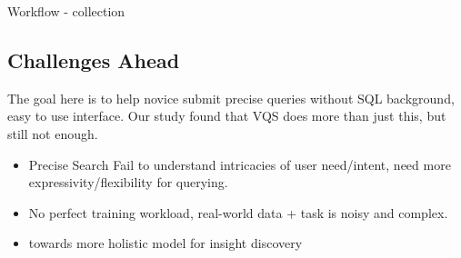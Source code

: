 Workflow 
	- collection 
\subsection{Challenges Ahead}
The goal here is to help novice submit precise queries without SQL background, easy to use interface. Our study found that VQS does more than just this, but still not enough.
\begin{itemize}
	\item Precise Search Fail to understand intricacies of user need/intent, need more expressivity/flexibility for querying.
	\item  No perfect training workload, real-world data + task is noisy and complex. 
	\item towards more holistic model for insight discovery
\end{itemize}
